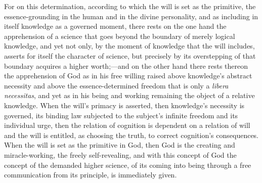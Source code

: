 \documentclass[12pt,a4paper]{book}
\begin{document}
For on this determination, according to which the will is set as the primitive,
the essence-grounding in the human and in the divine personality, and as including
in itself knowledge as a governed moment, there rests on the one hand the
apprehension of a science that goes beyond the boundary of merely logical
knowledge, and yet not only, by the moment of knowledge that the will includes,
asserts for itself the character of science, but precisely by its overstepping of
that boundary acquires a higher worth;---and on the other hand there rests
thereon the apprehension of God as in his free willing raised above knowledge's
abstract necessity and above the essence-determined freedom that is only a
\textit{libera necessitas}, and yet as in his being and working remaining the
object of a relative knowledge. When the will's primacy is asserted, then
knowledge's necessity is governed, its binding law subjected to the subject's
infinite freedom and its individual urge, then the relation of cognition is
dependent on a relation of will and the will is entitled, as choosing the truth,
to correct cognition's consequences. When the will is set as the primitive in God,
then God is the creating and miracle-working, the freely self-revealing, and with
this concept of God the concept of the demanded higher science, of its coming into
being through a free communication from its principle, is immediately given.
\end{document}
